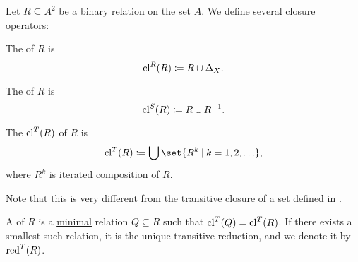 \begin{definition}\label{def:relation_closures}
  Let \( R \subseteq A^2 \) be a binary relation on the set \( A \). We define several \hyperref[def:closure_operator]{closure operators}:
  \begin{thmenum}
     The  of \( R \) is
    \begin{equation*}
      \operatorname{cl}^R(R) \coloneqq R \cup \Delta_X.
    \end{equation*}

     The  of \( R \) is
    \begin{equation*}
      \operatorname{cl}^S(R) \coloneqq R \cup R^{-1}.
    \end{equation*}

     The  \( \operatorname{cl}^T(R) \) of \( R \) is
    \begin{equation*}
      \cl^T(R) \coloneqq \bigcup \set{ R^k \given k = 1, 2, \ldots },
    \end{equation*}
    where \( R^k \) is iterated \hyperref[def:binary_relation/composition]{composition} of \( R \).

    Note that this is very different from the transitive closure of a set defined in .

    A  of \( R \) is a \hyperref[def:partially_ordered_set_extremal_points/maximal_and_minimal_element]{minimal} relation \( Q \subseteq R \) such that \( \operatorname{cl}^T(Q) = \operatorname{cl}^T(R) \). If there exists a smallest such relation, it is the unique transitive reduction, and we denote it by \( \operatorname{red}^T(R) \).
  \end{thmenum}
\end{definition}

